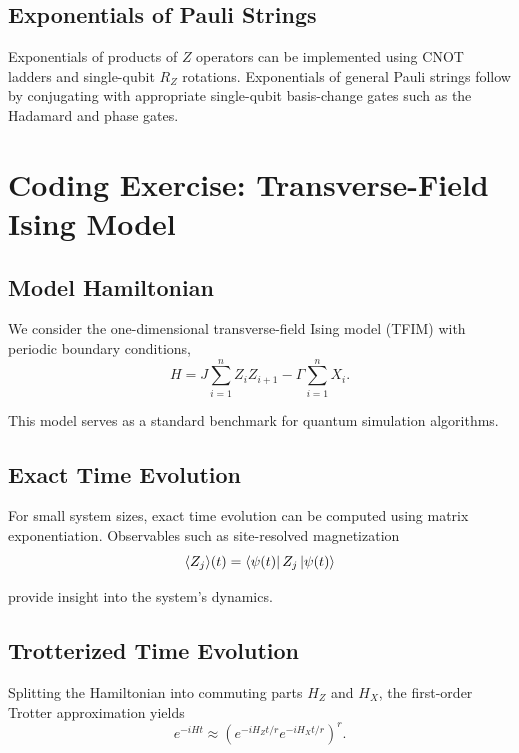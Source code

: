 \documentclass[11pt]{article}
\begin{document}
\subsection{Exponentials of Pauli Strings}

Exponentials of products of $Z$ operators can be implemented using CNOT ladders and single-qubit $R_Z$ rotations. Exponentials of general Pauli strings follow by conjugating with appropriate single-qubit basis-change gates such as the Hadamard and phase gates.

\section{Coding Exercise: Transverse-Field Ising Model}

\subsection{Model Hamiltonian}

We consider the one-dimensional transverse-field Ising model (TFIM) with periodic boundary conditions,
\begin{equation}
  H = J \sum_{i=1}^n Z_i Z_{i+1} - \Gamma \sum_{i=1}^n X_i.
\end{equation}

This model serves as a standard benchmark for quantum simulation algorithms.

\subsection{Exact Time Evolution}

For small system sizes, exact time evolution can be computed using matrix exponentiation. Observables such as site-resolved magnetization
\begin{equation}
  \langle Z_j \rangle(t) = \bra{\psi(t)} Z_j \ket{\psi(t)}
\end{equation}

provide insight into the system’s dynamics.

\subsection{Trotterized Time Evolution}

Splitting the Hamiltonian into commuting parts $H_Z$ and $H_X$, the first-order Trotter approximation yields
\begin{equation}
  e^{-iHt} \approx \left(e^{-iH_Z t/r} e^{-iH_X t/r}\right)^r.
\end{equation}
\end{document}
